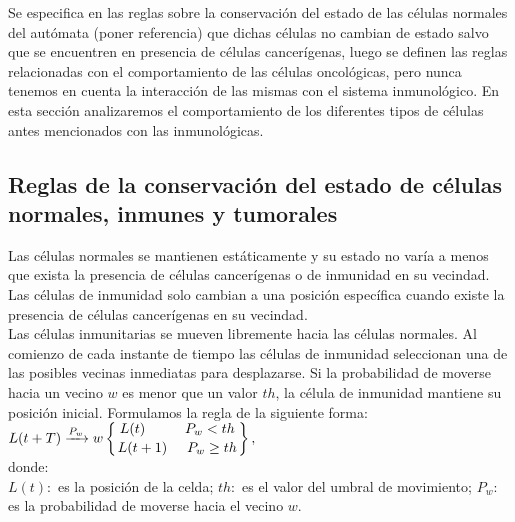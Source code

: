 Se especifica en las reglas sobre la conservaci\'on del estado de las c\'elulas normales del aut\'omata (poner referencia) que dichas c\'elulas no cambian de estado salvo que se encuentren en presencia de c\'elulas cancerígenas, luego se definen las reglas relacionadas con el comportamiento de las c\'elulas oncol\'ogicas, pero nunca tenemos en cuenta la interacci\'on de las mismas con el sistema inmunológico. En esta sección analizaremos el comportamiento de los diferentes tipos de c\'elulas antes mencionados con las inmunológicas.

\subsection{Reglas de la conservaci\'on del estado de c\'elulas normales, inmunes y tumorales}

Las c\'elulas normales se mantienen est\'aticamente y su estado no var\'ia a menos que exista la presencia de c\'elulas cancer\'igenas o de inmunidad en su vecindad.\\
Las c\'elulas de inmunidad solo cambian a una posici\'on espec\'ifica cuando existe la presencia de c\'elulas cancer\'igenas en su vecindad.\\
Las c\'elulas inmunitarias se mueven libremente hacia las c\'elulas normales.
Al comienzo de cada instante de tiempo las c\'elulas de inmunidad seleccionan una de las posibles vecinas inmediatas para desplazarse. Si la probabilidad de moverse hacia un vecino $w$ es menor que un valor $th$, la c\'elula de inmunidad mantiene su posici\'on inicial. Formulamos la regla de la siguiente forma:\\
$L(t+T) \xrightarrow{P_{w}} w  \displaystyle \left\{ {L(t) \hspace{1cm} P_w<th \atop L(t + 1) \hspace{.5cm} P_w \geq th } \right\},$\\

donde:\\
 $L(t):$ es la posici\'on de la celda;  $th:$ es el valor del umbral de movimiento;
 $P_{w}:$ es la probabilidad de moverse hacia el vecino $w$. 


